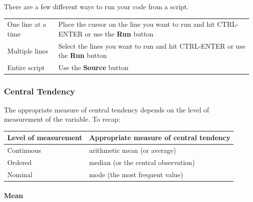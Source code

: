 \documentclass[]{article}
\let\oldparagraph\paragraph
\renewcommand{\paragraph}[1]{\oldparagraph{#1}\mbox{}}
\begin{document}
There are a few different ways to run your code from a script.

\begin{longtable}[]{@{}ll@{}}
\toprule
\endhead
\begin{minipage}[t]{0.23\columnwidth}\raggedright
One line at a time\strut
\end{minipage} & \begin{minipage}[t]{0.71\columnwidth}\raggedright
Place the cursor on the line you want to run and hit CTRL-ENTER or use the \textbf{Run} button\strut
\end{minipage}\tabularnewline
\begin{minipage}[t]{0.23\columnwidth}\raggedright
Multiple lines\strut
\end{minipage} & \begin{minipage}[t]{0.71\columnwidth}\raggedright
Select the lines you want to run and hit CTRL-ENTER or use the \textbf{Run} button\strut
\end{minipage}\tabularnewline
\begin{minipage}[t]{0.23\columnwidth}\raggedright
Entire script\strut
\end{minipage} & \begin{minipage}[t]{0.71\columnwidth}\raggedright
Use the \textbf{Source} button\strut
\end{minipage}\tabularnewline
\bottomrule
\end{longtable}

\hypertarget{central-tendency}{%
\subsubsection{Central Tendency}\label{central-tendency}}

The appropriate measure of central tendency depends on the level of measurement of the variable. To recap:

\begin{longtable}[]{@{}ll@{}}
\toprule
Level of measurement & Appropriate measure of central tendency\tabularnewline
\midrule
\endhead
Continuous & arithmetic mean (or average)\tabularnewline
Ordered & median (or the central observation)\tabularnewline
Nominal & mode (the most frequent value)\tabularnewline
\bottomrule
\end{longtable}

\hypertarget{mean}{%
\paragraph{Mean}\label{mean}}
\end{document}
